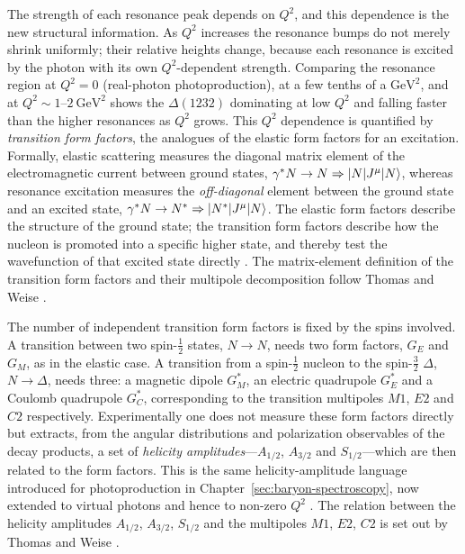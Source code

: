 The strength of each resonance peak depends on $Q^{2}$, and this dependence is the new
structural information. As $Q^{2}$ increases the resonance bumps do not merely shrink
uniformly; their relative heights change, because each resonance is excited by the
photon with its own $Q^{2}$-dependent strength. Comparing the resonance region at
$Q^{2}=0$ (real-photon photoproduction), at a few tenths of a $\mathrm{GeV}^{2}$, and at
$Q^{2}\sim 1$--$2~\mathrm{GeV}^{2}$ shows the $\Delta(1232)$ dominating at low $Q^{2}$
and falling faster than the higher resonances as $Q^{2}$ grows. This $Q^{2}$ dependence
is quantified by \emph{transition form factors}, the analogues of the elastic form
factors for an excitation. Formally, elastic scattering measures the diagonal matrix
element of the electromagnetic current between ground states,
$\gamma^{*}N\to N\Rightarrow\ket{N|J^{\mu}|N}$, whereas resonance excitation measures the
\emph{off-diagonal} element between the ground state and an excited state,
$\gamma^{*}N\to N^{*}\Rightarrow\ket{N^{*}|J^{\mu}|N}$. The elastic form factors describe
the structure of the ground state; the transition form factors describe how the nucleon
is promoted into a specific higher state, and thereby test the wavefunction of that
excited state directly \cite[Ch.~14]{Amsler2018}. The matrix-element definition of the
transition form factors and their multipole decomposition follow Thomas and Weise
\cite[Ch.~2.3]{ThomasWeise2001}.

The number of independent transition form factors is fixed by the spins involved. A
transition between two spin-$\tfrac{1}{2}$ states, $N\to N$, needs two form factors,
$G_{E}$ and $G_{M}$, as in the elastic case. A transition from a spin-$\tfrac{1}{2}$
nucleon to the spin-$\tfrac{3}{2}$ $\Delta$, $N\to\Delta$, needs three: a magnetic
dipole $G_{M}^{*}$, an electric quadrupole $G_{E}^{*}$ and a Coulomb quadrupole
$G_{C}^{*}$, corresponding to the transition multipoles $M1$, $E2$ and $C2$
respectively. Experimentally one does not measure these form factors directly but
extracts, from the angular distributions and polarization observables of the decay
products, a set of \emph{helicity amplitudes}---$A_{1/2}$, $A_{3/2}$ and
$S_{1/2}$---which are then related to the form factors. This is the same helicity-amplitude
language introduced for photoproduction in Chapter~\ref{sec:baryon-spectroscopy}, now
extended to virtual photons and hence to non-zero $Q^{2}$ \cite[Ch.~14]{Amsler2018}.
The relation between the helicity amplitudes $A_{1/2}$, $A_{3/2}$, $S_{1/2}$ and the
multipoles $M1$, $E2$, $C2$ is set out by Thomas and Weise
\cite[Ch.~2.3]{ThomasWeise2001}.

